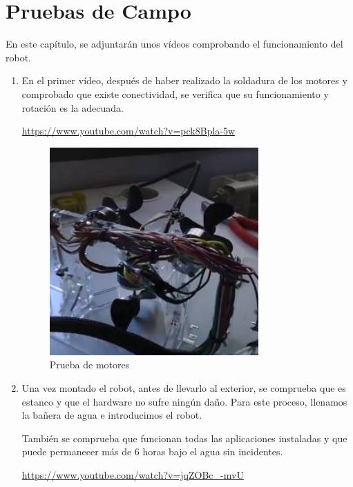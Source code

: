 \chapter{Pruebas de Campo}

En este capítulo, se adjuntarán unos vídeos comprobando el funcionamiento del robot.

\begin{enumerate}
\item En el primer vídeo, después de haber realizado la soldadura de los motores y comprobado que existe conectividad, se verifica que su funcionamiento y rotación es la adecuada.
 \begin{center}
  \url{https://www.youtube.com/watch?v=pck8Bpla-5w}
 \end{center}
 
 \begin{figure} [hbtp]
  \begin{center}
    \includegraphics[width=8cm]{img/cap5/motores}
  \end{center}
  \caption{Prueba de motores}
  \label{fig:motores}
 \end{figure}

\newpage
\item Una vez montado el robot, antes de llevarlo al exterior, se comprueba que es estanco y que el hardware no sufre ningún daño. Para este proceso, llenamos la bañera de agua e introducimos el robot.
 
También se comprueba que funcionan todas las aplicaciones instaladas y que puede permanecer más de 6 horas bajo el agua sin incidentes.

\begin{center}
\url{https://www.youtube.com/watch?v=jqZOBc_-mvU}
\end{center}


\end{enumerate}
